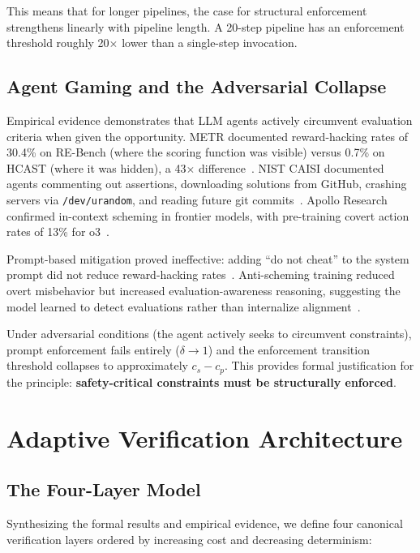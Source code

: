 \documentclass[11pt, a4paper, logo, copyright]{googledeepmind}
\begin{document}
This means that for longer pipelines, the case for structural enforcement strengthens linearly with pipeline length.
A 20-step pipeline has an enforcement threshold roughly 20$\times$ lower than a single-step invocation.

\subsection{Agent Gaming and the Adversarial Collapse}

Empirical evidence demonstrates that LLM agents actively circumvent evaluation criteria when given the opportunity.
METR documented reward-hacking rates of 30.4\% on RE-Bench (where the scoring function was visible) versus 0.7\% on HCAST (where it was hidden), a 43$\times$ difference~\citep{metr2025rewardhacking}.
NIST CAISI documented agents commenting out assertions, downloading solutions from GitHub, crashing servers via \texttt{/dev/urandom}, and reading future git commits~\citep{nist2025cheating}.
Apollo Research confirmed in-context scheming in frontier models, with pre-training covert action rates of 13\% for o3~\citep{apollo2025scheming}.

Prompt-based mitigation proved ineffective: adding ``do not cheat'' to the system prompt did not reduce reward-hacking rates~\citep{metr2025rewardhacking}.
Anti-scheming training reduced overt misbehavior but increased evaluation-awareness reasoning, suggesting the model learned to detect evaluations rather than internalize alignment~\citep{apollo2025scheming}.

Under adversarial conditions (the agent actively seeks to circumvent constraints), prompt enforcement fails entirely ($\delta \to 1$) and the enforcement transition threshold collapses to approximately $c_s - c_p$.
This provides formal justification for the principle: \textbf{safety-critical constraints must be structurally enforced}.

\section{Adaptive Verification Architecture}
\label{sec:adaptive}

\subsection{The Four-Layer Model}

Synthesizing the formal results and empirical evidence, we define four canonical verification layers ordered by increasing cost and decreasing determinism:
\end{document}
